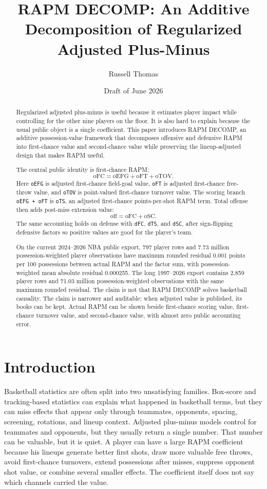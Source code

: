 \documentclass[11pt]{article}
\title{RAPM DECOMP: An Additive Decomposition of Regularized Adjusted Plus-Minus}
\author{Russell Thomas}
\date{Draft of June 2026}
\begin{document}
\maketitle

\begin{abstract}
Regularized adjusted plus-minus is useful because it estimates player impact
while controlling for the other nine players on the floor.  It is also hard to
explain because the usual public object is a single coefficient.  This paper
introduces RAPM DECOMP, an additive possession-value framework that decomposes
offensive and defensive RAPM into first-chance value and second-chance value
while preserving the lineup-adjusted design that makes RAPM useful.

The central public identity is first-chance RAPM:
\[
\text{oFC} = \text{oEFG} + \text{oFT} + \text{oTOV}.
\]
Here \texttt{oEFG} is adjusted first-chance field-goal value, \texttt{oFT} is
adjusted first-chance free-throw value, and \texttt{oTOV} is point-valued
first-chance turnover value.  The scoring branch \texttt{oEFG + oFT} is
\texttt{oTS}, an adjusted first-chance points-per-shot RAPM term.  Total
offense then adds post-miss extension value:
\[
\text{off} = \text{oFC} + \text{oSC}.
\]
The same accounting holds on defense with \texttt{dFC}, \texttt{dTS}, and
\texttt{dSC}, after sign-flipping defensive factors so positive values are good
for the player's team.

On the current 2024--2026 NBA public export, 797 player rows and 7.73 million
possession-weighted player observations have maximum rounded residual 0.001
points per 100 possessions between actual RAPM and the factor sum, with
possession-weighted mean absolute residual 0.000255.  The long 1997--2026
export contains 2,859 player rows and 71.03 million possession-weighted
observations with the same maximum rounded residual.  The claim is not that
RAPM DECOMP solves basketball causality.  The claim is narrower and auditable:
when adjusted value is published, its books can be kept.  Actual RAPM can be
shown beside first-chance scoring value, first-chance turnover value, and
second-chance value, with almost zero public accounting error.
\end{abstract}

\clearpage

\section{Introduction}

Basketball statistics are often split into two unsatisfying families.  Box-score
and tracking-based statistics can explain what happened in basketball terms,
but they can miss effects that appear only through teammates, opponents,
spacing, screening, rotations, and lineup context.  Adjusted plus-minus models
control for teammates and opponents, but they usually return a single number.
That number can be valuable, but it is quiet.  A player can have a large RAPM
coefficient because his lineups generate better first shots, draw more valuable
free throws, avoid first-chance turnovers, extend possessions after misses,
suppress opponent shot value, or combine several smaller effects.  The
coefficient itself does not say which channels carried the value.
\end{document}

